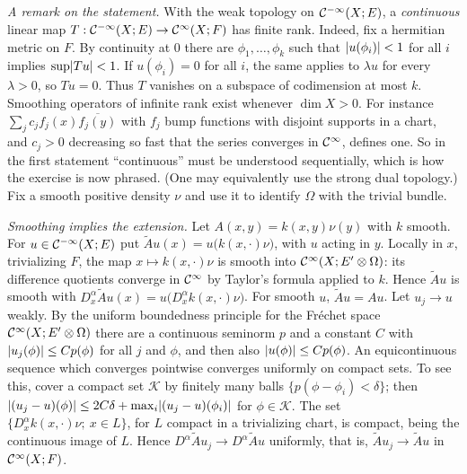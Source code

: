 \subsection*{}
\emph{A remark on the statement.} With the weak topology on $\mathcal{C}^{-\infty}(X;E)$, a
\emph{continuous} linear map $T:\mathcal{C}^{-\infty}(X;E)\to\mathcal{C}^\infty(X;F)$ has finite rank. Indeed, fix a
hermitian metric on $F$. By continuity at $0$ there are $\phi_1,\dots,\phi_k$ such that
$\lvert u(\phi_i)\rvert<1$ for all $i$ implies $\sup\lvert Tu\rvert<1$. If $u(\phi_i)=0$ for all $i$, the
same applies to $\lambda u$ for every $\lambda>0$, so $Tu=0$. Thus $T$ vanishes on a subspace of
codimension at most $k$. Smoothing operators of infinite rank exist whenever $\dim X>0$.
For instance $\sum_jc_jf_j(x)\overline{f_j(y)}$ with $f_j$ bump functions with disjoint
supports in a chart, and $c_j>0$ decreasing so fast that the series converges in $\mathcal{C}^\infty$,
defines one. So in the first statement ``continuous'' must be understood sequentially,
which is how the exercise is now phrased. (One may equivalently use the strong dual
topology.) Fix a smooth positive density $\nu$ and use it to identify $\Omega$ with the
trivial bundle.

\emph{Smoothing implies the extension.} Let $A(x,y)=k(x,y)\nu(y)$ with $k$ smooth. For
$u\in\mathcal{C}^{-\infty}(X;E)$ put $\tilde Au(x)=u\big(k(x,\cdot)\nu\big)$, with $u$ acting in $y$. Locally in
$x$, trivializing $F$, the map $x\mapsto k(x,\cdot)\nu$ is smooth into $\mathcal{C}^\infty(X;E'\otimes\Omega)$:
its difference quotients converge in $\mathcal{C}^\infty$ by Taylor's formula applied to $k$. Hence
$\tilde Au$ is smooth with $D^\alpha_x\tilde Au(x)=u\big(D^\alpha_xk(x,\cdot)\nu\big)$. For smooth $u$,
$\tilde Au=Au$. Let $u_j\to u$ weakly. By the uniform boundedness principle for the
Fr\'echet space $\mathcal{C}^\infty(X;E'\otimes\Omega)$ there are a continuous seminorm $p$ and a constant $C$
with $\lvert u_j(\phi)\rvert\le Cp(\phi)$ for all $j$ and $\phi$, and then also $\lvert u(\phi)\rvert\le Cp(\phi)$.
An equicontinuous sequence which converges pointwise converges uniformly on compact
sets. To see this, cover a compact set $\mathcal K$ by finitely many balls
$\{p(\phi-\phi_i)<\delta\}$; then
$\lvert (u_j-u)(\phi)\rvert\le2C\delta+\max_i\lvert (u_j-u)(\phi_i)\rvert$ for $\phi\in\mathcal K$. The set
$\{D^\alpha_xk(x,\cdot)\nu;\ x\in L\}$, for $L$ compact in a trivializing chart, is compact, being
the continuous image of $L$. Hence $D^\alpha\tilde Au_j\to D^\alpha\tilde Au$ uniformly, that is,
$\tilde Au_j\to\tilde Au$ in $\mathcal{C}^\infty(X;F)$.

